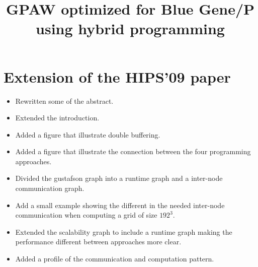 \documentclass[a4paper,10pt]{article}
\title{GPAW optimized for Blue Gene/P \\ using hybrid programming}
\date{}
\begin{document}
\maketitle

\section{Extension of the HIPS'09 paper}
\begin{itemize}
 \item Rewritten some of the abstract.
 \item Extended the introduction.
 \item Added a figure that illustrate double buffering.
 \item Added a figure that illustrate the connection between the four programming approaches.
 \item Divided the gustafson graph into a runtime graph and a inter-node communication graph.
 \item Add a small example showing the different in the needed inter-node communication when computing a grid of size $192^3$.
 \item Extended the scalability graph to include a runtime graph making the performance different between approaches more clear.
 \item Added a profile of the communication and computation pattern.
\end{itemize}
\end{document}
